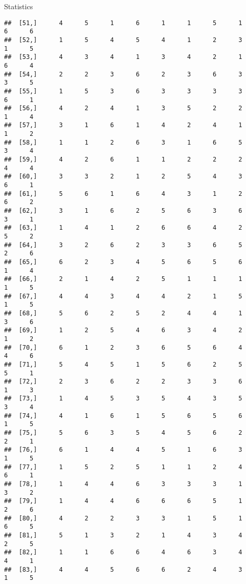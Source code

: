 \documentclass[
  ignorenonframetext,
]{beamer}
\begin{document}
\begin{frame}[fragile]{Statistics}
\begin{verbatim}
##  [51,]      4      5      1      6      1      1      5      1      6      6
##  [52,]      1      5      4      5      4      1      2      3      1      5
##  [53,]      4      3      4      1      3      4      2      1      6      4
##  [54,]      2      2      3      6      2      3      6      3      3      5
##  [55,]      1      5      3      6      3      3      3      3      6      1
##  [56,]      4      2      4      1      3      5      2      2      1      4
##  [57,]      3      1      6      1      4      2      4      1      1      2
##  [58,]      1      1      2      6      3      1      6      5      3      4
##  [59,]      4      2      6      1      1      2      2      2      4      4
##  [60,]      3      3      2      1      2      5      4      3      6      1
##  [61,]      5      6      1      6      4      3      1      2      6      2
##  [62,]      3      1      6      2      5      6      3      6      3      1
##  [63,]      1      4      1      2      6      6      4      2      5      2
##  [64,]      3      2      6      2      3      3      6      5      2      6
##  [65,]      6      2      3      4      5      6      5      6      1      4
##  [66,]      2      1      4      2      5      1      1      1      1      5
##  [67,]      4      4      3      4      4      2      1      5      1      5
##  [68,]      5      6      2      5      2      4      4      1      3      6
##  [69,]      1      2      5      4      6      3      4      2      1      2
##  [70,]      6      1      2      3      6      5      6      4      4      6
##  [71,]      5      4      5      1      5      6      2      5      5      1
##  [72,]      2      3      6      2      2      3      3      6      1      3
##  [73,]      1      4      5      3      5      4      3      5      3      4
##  [74,]      4      1      6      1      5      6      5      6      1      5
##  [75,]      5      6      3      5      4      5      6      2      2      1
##  [76,]      6      1      4      4      5      1      6      3      1      5
##  [77,]      1      5      2      5      1      1      2      4      6      1
##  [78,]      1      4      4      6      3      3      3      1      3      2
##  [79,]      1      4      4      6      6      6      5      1      2      6
##  [80,]      4      2      2      3      3      1      5      1      6      5
##  [81,]      5      1      3      2      1      4      3      4      2      5
##  [82,]      1      1      6      6      4      6      3      4      4      1
##  [83,]      4      4      5      6      6      2      4      3      1      5

\end{verbatim}
\end{frame}
\end{document}
